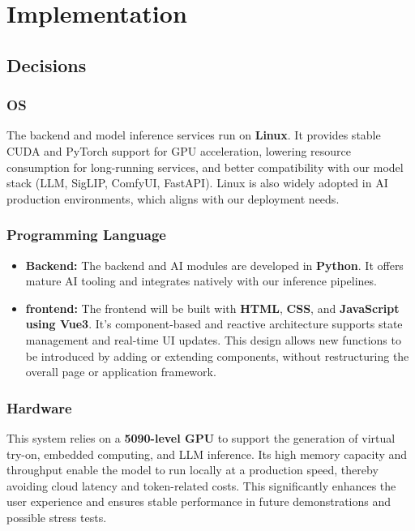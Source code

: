 \chapter{Implementation}
\label{ch:implementation}

\section{Decisions}
\subsection{OS}
The backend and model inference services run on \textbf{Linux}. It provides stable CUDA and PyTorch support for GPU acceleration, lowering resource consumption for long-running services, and better compatibility with our model stack (LLM, SigLIP, ComfyUI, FastAPI). Linux is also widely adopted in AI production environments, which aligns with our deployment needs.

\subsection{Programming Language}
\begin{itemize}
\item \textbf{Backend: }
The backend and AI modules are developed in \textbf{Python}. It offers mature AI tooling and integrates natively with our inference pipelines.
\item \textbf{frontend: }
The frontend will be built with \textbf{HTML}, \textbf{CSS}, and \textbf{JavaScript using Vue3}. It’s component-based and reactive architecture supports state management and real-time UI updates. This design allows new functions to be introduced by adding or extending components, without restructuring the overall page or application framework.
\end{itemize}

\subsection{Hardware}
This system relies on a \textbf{5090-level GPU} to support the generation of virtual try-on, embedded computing, and LLM inference. Its high memory capacity and throughput enable the model to run locally at a production speed, thereby avoiding cloud latency and token-related costs. This significantly enhances the user experience and ensures stable performance in future demonstrations and possible stress tests.

